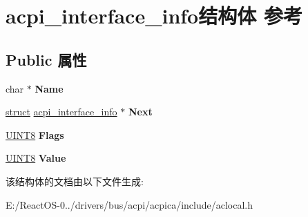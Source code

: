 \hypertarget{structacpi__interface__info}{}\section{acpi\+\_\+interface\+\_\+info结构体 参考}
\label{structacpi__interface__info}
\subsection*{Public 属性}
\begin{DoxyCompactItemize}
\item 
\mbox{\label{structacpi__interface__info_a0efe29d69855fda44b3b7c0db57f2280}} 
char $\ast$ {\bfseries Name}
\item 
\mbox{\label{structacpi__interface__info_a646dacc6567b662bedb24e08a4e1f556}} 
\hyperlink{interfacestruct}{struct} \hyperlink{structacpi__interface__info}{acpi\+\_\+interface\+\_\+info} $\ast$ {\bfseries Next}
\item 
\mbox{\label{structacpi__interface__info_a052c62268ec8cffc066dc57c997ef6c8}} 
\hyperlink{_processor_bind_8h_ab27e9918b538ce9d8ca692479b375b6a}{U\+I\+N\+T8} {\bfseries Flags}
\item 
\mbox{\label{structacpi__interface__info_ab1b1d4fbfdd0883c56b5099aec6efab8}} 
\hyperlink{_processor_bind_8h_ab27e9918b538ce9d8ca692479b375b6a}{U\+I\+N\+T8} {\bfseries Value}
\end{DoxyCompactItemize}


该结构体的文档由以下文件生成\+:\begin{DoxyCompactItemize}
\item 
E\+:/\+React\+O\+S-\/0../drivers/bus/acpi/acpica/include/aclocal.\+h\end{DoxyCompactItemize}
